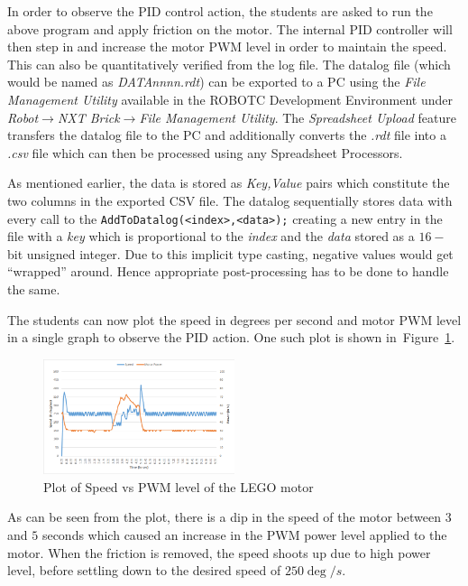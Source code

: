 \documentclass[paper=a4, fontsize=11pt]{scrartcl}
\numberwithin{equation}{section}        %
\numberwithin{figure}{section}          %
\numberwithin{table}{section}           %
\begin{document}
In order to observe the PID control action, the students are asked to run the above program and apply friction on the motor. The internal PID controller will then step in and increase the motor PWM level in order to maintain the speed. This can also be quantitatively verified from the log file. The datalog file (which would be named as \emph{DATAnnnn.rdt}) can be exported to a PC using the \emph{File Management Utility} available in the ROBOTC Development Environment under \emph{Robot$\to$NXT Brick$\to$File Management Utility}. The \emph{Spreadsheet Upload} feature transfers the datalog file to the PC and additionally converts the \emph{.rdt} file into a \emph{.csv} file which can then be processed using any Spreadsheet Processors.

As mentioned earlier, the data is stored as \emph{Key,Value} pairs which constitute the two columns in the exported CSV file. The datalog sequentially stores data with every call to the \verb|AddToDatalog(<index>,<data>);| creating a new entry in the file with a \emph{key} which is proportional to the \emph{index} and the \emph{data} stored as a $16-$bit unsigned integer. Due to this implicit type casting, negative values would get ``wrapped'' around. Hence appropriate post-processing has to be done to handle the same.

The students can now plot the speed in degrees per second and motor PWM level in a single graph to observe the PID action. One such plot is shown in~Figure~\ref{fig:pid_plot}.

\begin{figure}[!hbp]
	\includegraphics[width=0.5\textwidth]{pid_plot}
	\caption{Plot of Speed vs PWM level of the LEGO motor}
	\label{fig:pid_plot}
\end{figure}

As can be seen from the plot, there is a dip in the speed of the motor between $3$ and $5$ seconds which caused an increase in the PWM power level applied to the motor. When the friction is removed, the speed shoots up due to high power level, before settling down to the desired speed of $250 \deg/s$.
\end{document}
